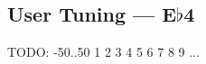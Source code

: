 \subsection{User Tuning --- E$\flat$4}









































TODO: -50..50
1
2
3
4
5
6
7
8
9
...